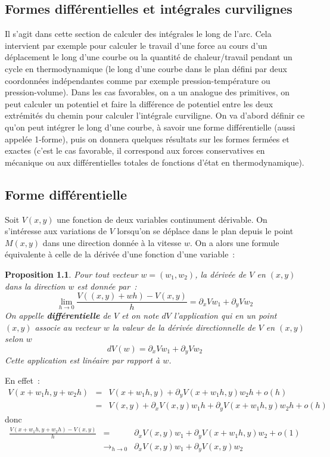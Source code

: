 \documentclass[a4paper,11pt]{book}
\newtheorem{prop}[thm]{Proposition}
\begin{document}
\begin{giacjshere}
\chapter{Formes diff\'erentielles et int\'egrales curvilignes} 
\label{sec:diff}
Il s'agit dans cette section de calculer des int\'egrales
le long de l'arc. Cela intervient
par exemple pour calculer le travail d'une force au cours d'un
d\'eplacement le long d'une courbe 
ou la quantit\'e de chaleur/travail pendant
un cycle en thermodynamique (le long d'une courbe
dans le plan d\'efini par deux coordonn\'ees ind\'ependantes 
comme par exemple pression-temp\'erature ou pression-volume). 
Dans les cas favorables, on a un analogue des primitives, on peut
calculer un potentiel et faire la diff\'erence de potentiel entre les
deux extr\'emit\'es du chemin pour calculer l'int\'egrale curviligne.
On va d'abord d\'efinir ce
qu'on peut int\'egrer le long d'une courbe, \`a savoir une
forme diff\'erentielle (aussi appel\'ee 1-forme), puis on
donnera quelques r\'esultats sur les formes ferm\'ees et
exactes (c'est le cas favorable, il correspond aux forces
conservatives en m\'ecanique ou aux diff\'erentielles totales
de fonctions d'\'etat en thermodynamique).

\section{Forme diff\'erentielle}
Soit $V(x,y)$ une fonction de deux variables continument d\'erivable.
On s'int\'eresse aux variations de $V$ lorsqu'on se d\'eplace dans le
plan depuis le point $M(x,y)$ dans une direction donn\'ee \`a
la vitesse $w$.
On a alors une formule \'equivalente \`a celle de 
la d\'eriv\'ee d'une fonction d'une variable~:
\begin{prop}
Pour tout vecteur $w=(w_1,w_2)$, la d\'eriv\'ee de $V$ en $(x,y)$
dans la direction $w$ est donn\'ee par~:
$$ \lim_{h\rightarrow 0} \frac{V((x,y)+wh)-V(x,y)}{h}=
\partial_xVw_1+\partial_yV w_2$$
On appelle {\bf diff\'erentielle} 
de $V$ et on note $dV$ l'application
qui en un point $(x,y)$ associe au vecteur $w$ la valeur de la
d\'eriv\'ee directionnelle de $V$ en $(x,y)$ selon $w$
$$ dV(w)=\partial_xV w_1+\partial_yV w_2$$
Cette application est lin\'eaire par rapport \`a $w$.
\end{prop}
En effet~:
\begin{eqnarray*}
 V(x+w_1h,y+w_2h)&=&V(x+w_1h,y)+\partial_yV(x+w_1h,y) w_2h + o(h)\\
&=&V(x,y)+\partial_xV(x,y) w_1 h + \partial_yV(x+w_1h,y) w_2h + o(h)
\end{eqnarray*}
donc
\begin{eqnarray*}
 \frac{V(x+w_1h,y+w_2h)-V(x,y)}{h} & = &
\partial_xV(x,y) w_1 + \partial_yV(x+w_1h,y) w_2 +o(1) \\
&\rightarrow_{h\rightarrow 0} & \partial_xV(x,y) w_1
+ \partial_yV(x,y) w_2 
\end{eqnarray*}


\end{giacjshere}
\end{document}
